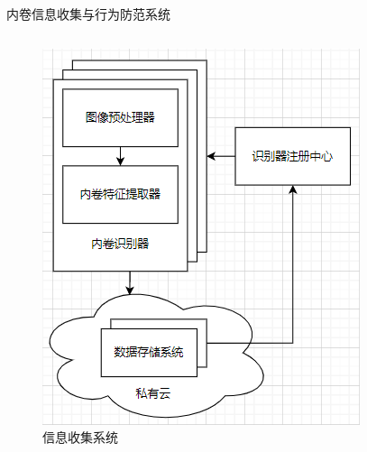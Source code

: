 \begin{frame}{内卷信息收集与行为防范系统}
\begin{columns}
            \begin{figure}
                \centering
                \includegraphics[width=\textwidth]{contents/figure/collector-part-1.png}
                \caption{信息收集系统}
                \label{fig:collector-part-1}
            \end{figure}


\end{columns}
\end{frame}
